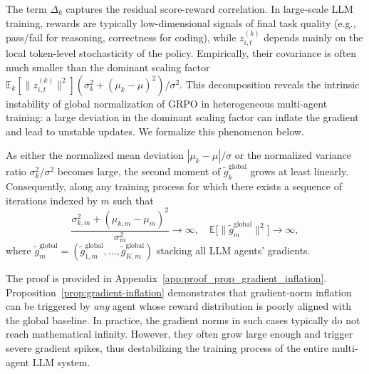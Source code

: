 The term $\Delta_k$ captures the residual score-reward correlation. In large-scale LLM training, rewards are typically low-dimensional signals of final task quality (e.g., pass/fail for reasoning, correctness for coding), while $z_{i,t}^{(k)}$ depends mainly on the local token-level stochasticity of the policy. Empirically, their covariance is often much smaller than the dominant scaling factor $\mathbb{E}_k[\|z_{i,t}^{(k)}\|^2](\sigma_k^2 + (\mu_k - \mu)^2)/\sigma^2$. This decomposition reveals the intrinsic instability of global normalization of GRPO in heterogeneous multi-agent training: a large deviation in the dominant scaling factor can inflate the gradient and lead to unstable updates. We formalize this phenomenon below.
\begin{proposition}
\label{prop:gradient-inflation}
As either the normalized mean deviation
$|\mu_k - \mu| / \sigma$ or the normalized variance ratio
$\sigma_k^2 / \sigma^2$ becomes large, the second moment of
$\tilde{g}_k^{\mathrm{global}}$ grows at least linearly. Consequently, along any training process for which there exists a sequence of iterations indexed by $m$ such that
$$
\frac{\sigma_{k,m}^2 + (\mu_{k,m} - \mu_m)^2}{\sigma_m^2} \to \infty, \quad  \mathbb{E}\bigl[\|\tilde{g}_m^{\mathrm{global}}\|^2\bigr] \to \infty,
$$
where $\tilde{g}_{m}^{\mathrm{global}} = (\tilde{g}_{1,m}^{\mathrm{global}},\dots,\tilde{g}_{K,m}^{\mathrm{global}})$ stacking all LLM agents' gradients.
\end{proposition}
The proof is provided in Appendix~\ref{app:proof_prop_gradient_inflation}. Proposition~\ref{prop:gradient-inflation} demonstrates that gradient-norm inflation can be triggered by \emph{any} agent whose reward distribution is poorly aligned with the global baseline. In practice, the gradient norms in such cases typically do not reach mathematical infinity. However, they often grow large enough and trigger severe gradient spikes, thus destabilizing the training process of the entire multi-agent LLM system.


